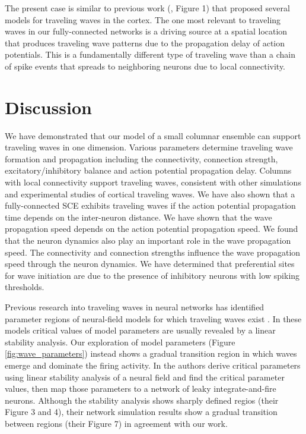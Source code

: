 \documentclass[12pt]{article}
\begin{document}
The present case is similar to previous work (\parencite{ermentrout2001}, Figure 1) that proposed several models for traveling waves in the cortex.
The one most relevant to traveling waves in our fully-connected networks is a driving source at a spatial location that produces traveling wave patterns due to the propagation delay of action potentials.
This is a fundamentally different type of traveling wave than a chain of spike events that spreads to neighboring neurons due to local connectivity.

\section{Discussion}
We have demonstrated that \color{red}our model of a small columnar ensemble\color{black} can support traveling waves in one dimension.
Various parameters determine traveling wave formation and propagation including the connectivity, connection strength, excitatory/inhibitory balance and action potential propagation delay.
Columns with local connectivity support traveling waves, consistent with other simulations and experimental studies of cortical traveling waves.
We have also shown that  a fully-connected SCE exhibits traveling waves if the action potential propagation time depends on the inter-neuron distance. 
We have shown that the wave propagation speed depends on the action potential propagation speed.
We found that the neuron dynamics also play an important role in the wave propagation speed.
The connectivity and connection strengths influence the wave propagation speed through the neuron dynamics.
We have determined that preferential sites for wave initiation are due to the presence of inhibitory neurons with low spiking thresholds.

Previous research into traveling waves in neural networks has identified parameter regions of neural-field models for which traveling waves exist \color{red}\parencite{Wilson1973}\parencite{Ermentrout1979}\color{black}. 
\color{red}
In these models critical values of model parameters are usually revealed by a linear stability analysis.
\color{black}
Our exploration of model parameters (Figure \ref{fig:wave_parameters}) instead shows a gradual transition region in which waves emerge and dominate the firing activity.
\color{red}
In \parencite{Senk2020} the authors derive critical parameters using linear stability analysis of a neural field and find the critical parameter values, then map those parameters to a network of leaky integrate-and-fire neurons.
Although the stability analysis shows sharply defined regios (their Figure 3 and 4), their network simulation results show a gradual transition between regions (their Figure 7) in agreement with our work.
\color{black}
\end{document}
